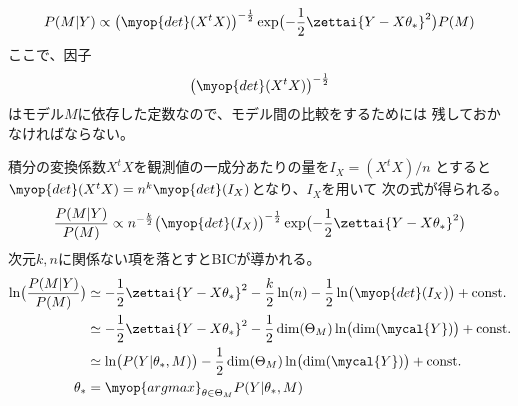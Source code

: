 \begin{example}[線形モデルでの積分]
\begin{equation*}
\begin{split}
				P(M|Y) \propto \bigl(\myop{det}(X^tX)\bigr)^{-\frac{1}{2}}
					\exp\bigl(-\frac{1}{2}\zettai{Y-X\theta_*}^2\bigr)P(M) \\
			\end{split}\end{equation*} %
			ここで、因子
			\begin{equation*}\begin{split} %
				\bigl(\myop{det}(X^tX)\bigr)^{-\frac{1}{2}}
			\end{split}\end{equation*} %
			はモデル$M$に依存した定数なので、モデル間の比較をするためには
			残しておかなければならない。

			積分の変換係数$X^tX$を観測値の一成分あたりの量を$I_X=(X^tX)/n$
			とすると$\myop{det}(X^tX)=n^k\myop{det}(I_X)$となり、$I_X$を用いて
			次の式が得られる。
			\begin{equation*}\begin{split} %
				\frac{P(M|Y)}{P(M)} \propto n^{-\frac{k}{2}}
					\bigl(\myop{det}(I_X)\bigr)^{-\frac{1}{2}}
					\exp\bigl(-\frac{1}{2}\zettai{Y-X\theta_*}^2\bigr) \\
			\end{split}\end{equation*} %
			次元$k,n$に関係ない項を落とすとBICが導かれる。
			\begin{equation*}\begin{split} %
				\ln\bigl(\frac{P(M|Y)}{P(M)}\bigr)
				&\simeq -\frac{1}{2}\zettai{Y-X\theta_*}^2 
				- \frac{k}{2}\ln(n)
				- \frac{1}{2}\ln\bigl(\myop{det}(I_X)\bigr)
				+ \text{const.} \\
				&\simeq -\frac{1}{2}\zettai{Y-X\theta_*}^2
				- \frac{1}{2}\dim(\Theta_M)\ln\bigl(\dim(\mycal{Y})\bigr)
				+ \text{const.} \\
				&\simeq \ln\bigl(P(Y|\theta_*,M)\bigr)
				- \frac{1}{2}\dim(\Theta_M)\ln\bigl(\dim(\mycal{Y})\bigr)
				+ \text{const.} \\
				\theta_* &= \myop{argmax}_{\theta\in\Theta_M}P(Y|\theta_*,M)
			\end{split}\end{equation*} %
		\end{example} %

